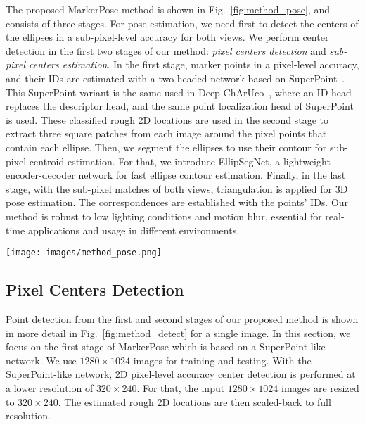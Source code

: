 \documentclass[final]{cvpr}
\begin{document}
The proposed MarkerPose method is shown in Fig.~\ref{fig:method_pose}, and consists of three stages. For pose estimation, we need first to detect the centers of the ellipses in a sub-pixel-level accuracy for both views. We perform center detection in the first two stages of our method: \textit{pixel centers detection} and \textit{sub-pixel centers estimation}. In the first stage, marker points in a pixel-level accuracy, and their IDs are estimated with a two-headed network based on SuperPoint~\cite{detone2018superpoint}. This SuperPoint variant is the same used in Deep ChArUco~\cite{hu2019deep}, where an ID-head replaces the descriptor head, and the same point localization head of SuperPoint is used. These classified rough 2D locations are used in the second stage to extract three square patches from each image around the pixel points that contain each ellipse. Then, we segment the ellipses to use their contour for sub-pixel centroid estimation. For that, we introduce EllipSegNet, a lightweight encoder-decoder network for fast ellipse contour estimation. Finally, in the last stage, with the sub-pixel matches of both views, triangulation is applied for 3D pose estimation. The correspondences are established with the points' IDs. Our method is robust to low lighting conditions and motion blur, essential for real-time applications and usage in different environments.

\begin{figure*}
    \centering
    \texttt{[image: images/method\_pose.png]}
    \caption{MarkerPose: the proposed approach for marker-based pose estimation, which consists of three stages. The first and second stage is for sub-pixel centers estimation, and the last stage for triangulation and target pose estimation.}
    \label{fig:method_pose}
\end{figure*}




\subsection{Pixel Centers Detection}
Point detection from the first and second stages of our proposed method is shown in more detail in Fig.~\ref{fig:method_detect} for a single image. In this section, we focus on the first stage of MarkerPose which is based on a SuperPoint-like network. We use $1280 \times 1024$ images for training and testing. With the SuperPoint-like network, 2D pixel-level accuracy center detection is performed at a lower resolution of $320 \times 240$. For that, the input $1280 \times 1024$ images are resized to $320 \times 240$. The estimated rough 2D locations are then scaled-back to full resolution.
\end{document}
